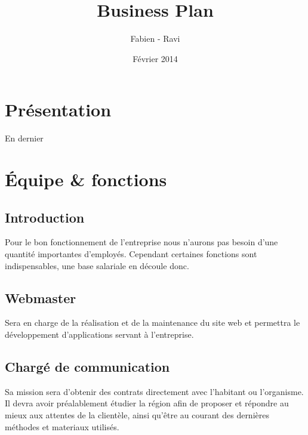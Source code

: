 \documentclass[11pt]{article}
\title{\textbf{Business Plan}\\{ {\small {\bsc {- Res Publica -}}}}}
\author{Fabien \bsc{Buisson} - Ravi \bsc{Pachy}}
\date{Février 2014}
\begin{document}
\renewcommand{\contentsname}{Sommaire}
\maketitle
\thispagestyle{empty}

\newpage

\tableofcontents

\newpage
\pagestyle{headings}

\section{Présentation}
\label{sec:presentation}
En dernier



\section{Équipe \& fonctions}
\label{sec:equipe_fonctions}

\subsection{Introduction}
\label{sub:equipe_intro}
Pour le bon fonctionnement de l'entreprise nous n'aurons pas besoin d'une quantité importantes d'employés. Cependant certaines fonctions sont indispensables, une base salariale en découle donc.

\subsection{Webmaster}
\label{sec:webmaster}
Sera en charge de la réalisation et de la maintenance du site web et permettra le développement d'applications servant à l'entreprise.


\subsection{Chargé de communication}
\label{sec:communication}
Sa mission sera d'obtenir des contrats directement avec l'habitant ou l'organisme. Il devra avoir préalablement étudier la région afin de proposer et répondre au mieux aux attentes de la clientèle, ainsi qu'être au courant des dernières méthodes et materiaux utilisés.

\end{document}
